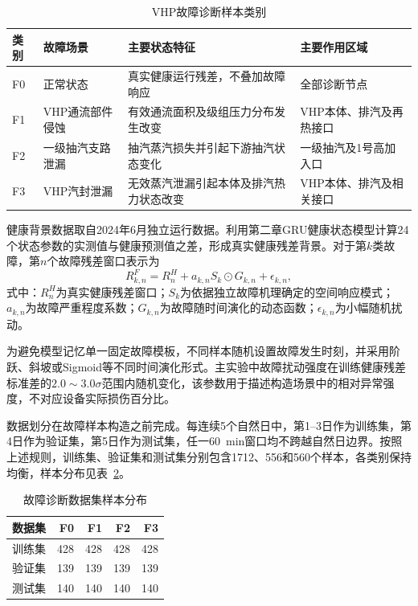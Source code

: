 \begin{table}[htbp]
    \centering
    \caption{VHP故障诊断样本类别}
    \label{tab:fault_classes_v7}
    \begin{tabular}{p{1.0cm}p{4.2cm}p{5.2cm}p{3.3cm}}
        \toprule
        类别 & 故障场景 & 主要状态特征 & 主要作用区域 \\
        \midrule
        F0 & 正常状态 & 真实健康运行残差，不叠加故障响应 & 全部诊断节点 \\
        F1 & VHP通流部件侵蚀 & 有效通流面积及级组压力分布发生改变 & VHP本体、排汽及再热接口 \\
        F2 & 一级抽汽支路泄漏 & 抽汽蒸汽损失并引起下游抽汽状态变化 & 一级抽汽及1号高加入口 \\
        F3 & VHP汽封泄漏 & 无效蒸汽泄漏引起本体及排汽热力状态改变 & VHP本体、排汽及相关接口 \\
        \bottomrule
    \end{tabular}
\end{table}

健康背景数据取自2024年6月独立运行数据。利用第二章GRU健康状态模型计算24个状态参数的实测值与健康预测值之差，形成真实健康残差背景。对于第$k$类故障，第$n$个故障残差窗口表示为
\begin{equation}
R_{k,n}^{F}=R_n^{H}+a_{k,n}S_k\odot G_{k,n}+\epsilon_{k,n},
\end{equation}
式中：$R_n^{H}$为真实健康残差窗口；$S_k$为依据独立故障机理确定的空间响应模式；$a_{k,n}$为故障严重程度系数；$G_{k,n}$为故障随时间演化的动态函数；$\epsilon_{k,n}$为小幅随机扰动。

为避免模型记忆单一固定故障模板，不同样本随机设置故障发生时刻，并采用阶跃、斜坡或Sigmoid等不同时间演化形式。主实验中故障扰动强度在训练健康残差标准差的$2.0\sim3.0\sigma$范围内随机变化，该参数用于描述构造场景中的相对异常强度，不对应设备实际损伤百分比。

数据划分在故障样本构造之前完成。每连续5个自然日中，第1--3日作为训练集，第4日作为验证集，第5日作为测试集，任一60~min窗口均不跨越自然日边界。按照上述规则，训练集、验证集和测试集分别包含1712、556和560个样本，各类别保持均衡，样本分布见表~\ref{tab:fault_split_v7}。

\begin{table}[htbp]
    \centering
    \caption{故障诊断数据集样本分布}
    \label{tab:fault_split_v7}
    \begin{tabular}{lrrrr}
        \toprule
        数据集 & F0 & F1 & F2 & F3 \\
        \midrule
        训练集 & 428 & 428 & 428 & 428 \\
        验证集 & 139 & 139 & 139 & 139 \\
        测试集 & 140 & 140 & 140 & 140 \\
        \bottomrule
    \end{tabular}
\end{table}

